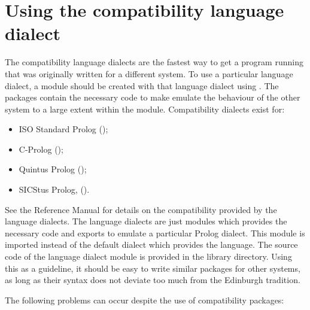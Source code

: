 \section{Using the compatibility language dialect}
The {\eclipse} compatibility language dialects are the fastest way to get a
program running that was originally written for a different system.
To use a particular language dialect, a module
should be created with that language dialect using
.
The packages contain the necessary code to make {\eclipse} emulate
the behaviour of the other system to a large extent within the module.
Compatibility dialects exist for:
\begin{itemize}
\item ISO Standard Prolog ();
\item C-Prolog ();
\item Quintus Prolog ();
\item SICStus Prolog, ().
\end{itemize}
See the Reference Manual for details on the compatibility provided by the
language dialects.
The language dialects are just modules which provides the necessary code
and exports  to emulate a particular Prolog dialect. This module is imported
instead of the default  dialect which provides the
{\eclipse} language.
The source code of the language dialect module is provided in the
{\eclipse} library directory.
Using this as a guideline, it should be easy to write similar packages for
other systems, as long as their syntax does not deviate too much
from the Edinburgh tradition.

The following problems can occur despite the use of compatibility packages:

